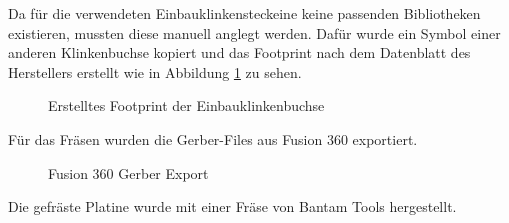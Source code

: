 Da für die verwendeten Einbauklinkensteckeine keine passenden Bibliotheken existieren, mussten diese manuell anglegt werden.
Dafür wurde ein Symbol einer anderen Klinkenbuchse kopiert und das Footprint nach dem Datenblatt des Herstellers erstellt wie in Abbildung \ref{fig:Klinkenbuchse Footprint} zu sehen.

\begin{figure}[h]
	\centering
	\setlength{\fboxsep}{1pt} %
	\setlength{\fboxrule}{1pt} %
	\caption{Erstelltes Footprint der Einbauklinkenbuchse}
	\label{fig:Klinkenbuchse Footprint}
\end{figure}



Für das Fräsen wurden die Gerber-Files aus Fusion 360 exportiert.

\begin{figure}[h]
	\centering
	\setlength{\fboxsep}{1pt} %
	\setlength{\fboxrule}{1pt} %
	\caption{Fusion 360 Gerber Export}
	\label{fig:Gerber}
\end{figure}



Die gefräste Platine wurde mit einer Fräse von Bantam Tools hergestellt.



